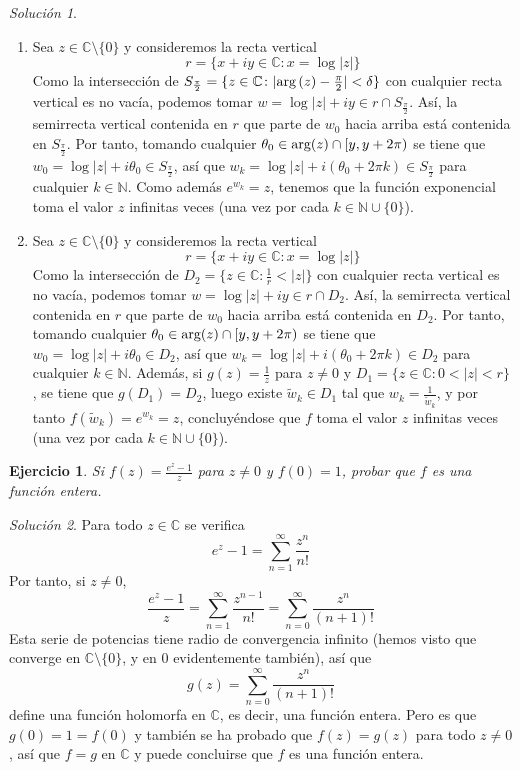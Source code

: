 \documentclass[11pt]{report}
\newcommand{\N}{\mathbb N}
\newcommand{\C}{\mathbb C}
\newcommand{\serie}[2][0]{\sum_{n=#1}^\infty #2}
\newtheorem{exercise}{Ejercicio}
\theoremstyle{remark}
\newtheorem*{resolution}{Solución}
\begin{document}
\begin{resolution}
\hfill
\begin{enumerate}
    \item Sea $z \in \C \setminus\{0\}$ y consideremos la recta vertical
    \[r = \bigl\{x+iy \in \C \colon x = \log|z|\bigr\}\]
    Como la intersección de $S_{\frac{\pi}{2}} = \{z \in \C \colon |\textup{arg}\,(z)-\frac{\pi}{2}| < \delta\}$ con cualquier recta vertical es no vacía, podemos tomar $w = \log|z|+iy \in r \cap S_{\frac{\pi}{2}}$. Así, la semirrecta vertical contenida en $r$ que parte de $w_0$ hacia arriba está contenida en $S_{\frac{\pi}{2}}$. Por tanto, tomando cualquier $\theta_0 \in \textup{arg}(z) \cap [y,y+2\pi)$ se tiene que $w_0 = \log|z|+i\theta_0 \in S_{\frac{\pi}{2}}$, así que $w_k = \log|z|+i(\theta_0+2\pi k) \in S_{\frac{\pi}{2}}$ para cualquier $k \in \N$. Como además $e^{w_k} = z$, tenemos que la función exponencial toma el valor $z$ infinitas veces  (una vez por cada $k \in \N \cup \{0\}$).
    \item Sea $z \in \C \setminus\{0\}$ y consideremos la recta vertical
    \[r = \bigl\{x+iy \in \C \colon x = \log|z|\bigr\}\]
    Como la intersección de $D_2=\{z \in \C \colon \frac{1}{r}<|z|\}$ con cualquier recta vertical es no vacía, podemos tomar $w = \log|z|+iy \in r \cap D_2$. Así, la semirrecta vertical contenida en $r$ que parte de $w_0$ hacia arriba está contenida en $D_2$. Por tanto, tomando cualquier $\theta_0 \in \textup{arg}(z) \cap [y,y+2\pi)$ se tiene que $w_0 = \log|z|+i\theta_0 \in D_2$, así que $w_k = \log|z|+i(\theta_0+2\pi k) \in D_2$ para cualquier $k \in \N$. Además, si $g(z) = \frac{1}{z}$ para $z \neq 0$ y $D_1 = \{z \in \C \colon 0 < |z| <r\}$, se tiene que $g(D_1)=D_2$, luego existe $\widetilde{w}_k \in D_1$ tal que $w_k = \frac{1}{\widetilde{w}_k}$, y por tanto $f(\widetilde{w}_k) = e^{w_k} = z$, concluyéndose que $f$ toma el valor $z$ infinitas veces (una vez por cada $k \in \N \cup \{0\}$).
\end{enumerate}
\end{resolution}

\begin{exercise}
Si $f(z) = \frac{e^z-1}{z}$ para $z\neq0$ y $f(0)=1$, probar que $f$ es una función entera.
\end{exercise}

\begin{resolution}
Para todo $z \in \C$ se verifica
\[e^z-1 = \serie[1]{\frac{z^n}{n!}}\]
Por tanto, si $z \neq 0$,
\[\frac{e^z-1}{z} = \serie[1]\frac{z^{n-1}}{n!} = \serie{\frac{z^n}{(n+1)!}}\]
Esta serie de potencias tiene radio de convergencia infinito (hemos visto que converge en $\C \setminus \{0\}$, y en $0$ evidentemente también), así que
\[g(z) =  \serie{\frac{z^n}{(n+1)!}}\]
define una función holomorfa en $\C$, es decir, una función entera. Pero es que $g(0)=1=f(0)$ y también se ha probado que $f(z) = g(z)$ para todo $z \neq 0$, así que $f = g$ en $\C$ y puede concluirse que $f$ es una función entera.
\end{resolution}
\end{document}
